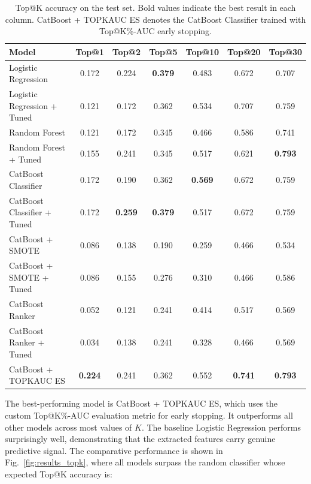 \documentclass{ieeeaccess}
\begin{document}
\begin{table}[!t]
    \centering
    \setlength{\tabcolsep}{6pt}
    \renewcommand{\arraystretch}{1.2}
    \caption{Top@K accuracy on the test set. Bold values indicate the best result in each column. CatBoost + TOPKAUC ES denotes the CatBoost Classifier trained with Top@K\%-AUC early stopping.}
    \begin{tabular}{lcccccc}
        \toprule
        Model & Top@1 & Top@2 & Top@5 & Top@10 & Top@20 & Top@30 \\
        \midrule
        Logistic Regression & 0.172 & 0.224 & \textbf{0.379} & 0.483 & 0.672 & 0.707 \\
        Logistic Regression + Tuned & 0.121 & 0.172 & 0.362 & 0.534 & 0.707 & 0.759 \\
        Random Forest & 0.121 & 0.172 & 0.345 & 0.466 & 0.586 & 0.741 \\
        Random Forest + Tuned & 0.155 & 0.241 & 0.345 & 0.517 & 0.621 & \textbf{0.793} \\
        CatBoost Classifier & 0.172 & 0.190 & 0.362 & \textbf{0.569} & 0.672 & 0.759 \\
        CatBoost Classifier + Tuned & 0.172 & \textbf{0.259} & \textbf{0.379} & 0.517 & 0.672 & 0.759 \\
        CatBoost + SMOTE & 0.086 & 0.138 & 0.190 & 0.259 & 0.466 & 0.534 \\
        CatBoost + SMOTE + Tuned & 0.086 & 0.155 & 0.276 & 0.310 & 0.466 & 0.586 \\
        CatBoost Ranker & 0.052 & 0.121 & 0.241 & 0.414 & 0.517 & 0.569 \\
        CatBoost Ranker + Tuned & 0.034 & 0.138 & 0.241 & 0.328 & 0.466 & 0.569 \\
        CatBoost + TOPKAUC ES & \textbf{0.224} & 0.241 & 0.362 & 0.552 & \textbf{0.741} & \textbf{0.793} \\
        \bottomrule
    \end{tabular}
    \label{table:results_topk}
\end{table}


The best-performing model is CatBoost + TOPKAUC ES, which uses the custom Top@K\%-AUC evaluation metric for early stopping. It outperforms all other models across most values of $K$. The baseline Logistic Regression performs surprisingly well, demonstrating that the extracted features carry genuine predictive signal. The comparative performance is shown in Fig.~\ref{fig:results_topk}, where all models surpass the random classifier whose expected Top@K accuracy is:
\end{document}
